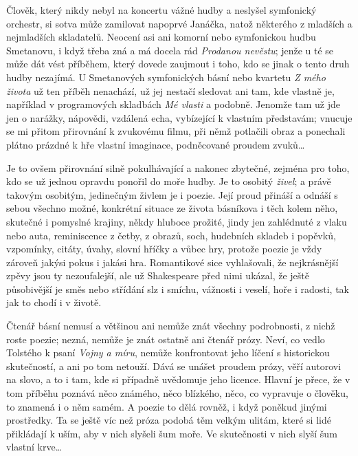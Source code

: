 Člověk, který nikdy nebyl na koncertu vážné hudby a neslyšel symfonický orchestr, si sotva může zamilovat napoprvé Janáčka, natož některého z mladších a nejmladších skladatelů. Neocení asi ani komorní nebo symfonickou hudbu Smetanovu, i když třeba zná a má docela rád \textit{Prodanou nevěstu}; jenže u té se může dát vést příběhem, který dovede zaujmout i toho, kdo se jinak o tento druh hudby nezajímá. U Smetanových symfonických básní nebo kvartetu \textit{Z mého života} už ten příběh nenachází, už jej nestačí sledovat ani tam, kde vlastně je, například v programových skladbách \textit{Mé vlasti} a podobně. Jenomže tam už jde jen o narážky, nápovědi, vzdálená echa, vybízející k vlastním představám; vnucuje se mi přitom přirovnání k zvukovému filmu, při němž potlačili obraz a ponechali plátno prázdné k hře vlastní imaginace, podněcované proudem zvuků…

Je to ovšem přirovnání silně pokulhávající a nakonec zbytečné, zejména pro toho, kdo se už jednou opravdu ponořil do moře hudby. Je to osobitý \textit{živel}; a právě takovým osobitým, jedinečným živlem je i poezie. Její proud přináší a odnáší s sebou všechno možné, konkrétní situace ze života básníkova i těch kolem něho, skutečné i pomyslné krajiny, někdy hluboce prožité, jindy jen zahlédnuté z vlaku nebo auta, reminiscence z četby, z obrazů, soch, hudebních skladeb i popěvků, vzpomínky, citáty, úvahy, slovní hříčky a vůbec hry, protože poezie je vždy zároveň jakýsi pokus i jakási hra. Romantikové sice vyhlašovali, že nejkrásnější zpěvy jsou ty nezoufalejší, ale už Shakespeare před nimi ukázal, že ještě působivější je směs nebo střídání slz i smíchu, vážnosti i veselí, hoře i radosti, tak jak to chodí i v životě.

Čtenář básní nemusí a většinou ani nemůže znát všechny podrobnosti, z nichž roste poezie; nezná, nemůže je znát ostatně ani čtenář prózy. Neví, co vedlo Tolstého k psaní \textit{Vojny a míru}, nemůže konfrontovat jeho líčení s historickou skutečností, a ani po tom netouží. Dává se unášet proudem prózy, věří autorovi na slovo, a to i tam, kde si případně uvědomuje jeho licence. Hlavní je přece, že v tom příběhu poznává něco známého, něco blízkého, něco, co vypravuje o člověku, to znamená i o něm samém. A poezie to dělá rovněž, i když poněkud jinými prostředky. Ta se ještě víc než \pagebreak próza podobá těm velkým ulitám, které si lidé přikládají k uším, aby v nich slyšeli šum moře. Ve skutečnosti v nich slyší šum vlastní krve…

